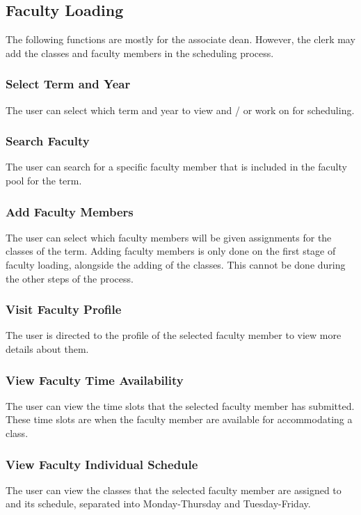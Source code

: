     \subsection{Faculty Loading}
    The following functions are mostly for the associate dean. However, the clerk may add the classes and faculty members in the scheduling process.
    
        \subsubsection{Select Term and Year}
        The user can select which term and year to view and / or work on for scheduling.
        
        \subsubsection{Search Faculty}
        The user can search for a specific faculty member that is included in the faculty pool for the term.
        
        \subsubsection{Add Faculty Members}
        The user can select which faculty members will be given assignments for the classes of the term. Adding faculty members is only done on the first stage of faculty loading, alongside the adding of the classes. This cannot be done during the other steps of the process.
        
        \subsubsection{Visit Faculty Profile}
        The user is directed to the profile of the selected faculty member to view more details about them.

        \subsubsection{View Faculty Time Availability}
        The user can view the time slots that the selected faculty member has submitted. These time slots are when the faculty member are available for accommodating a class.
        
        \subsubsection{View Faculty Individual Schedule}
        The user can view the classes that the selected faculty member are assigned to and its schedule, separated into Monday-Thursday and Tuesday-Friday.
        
